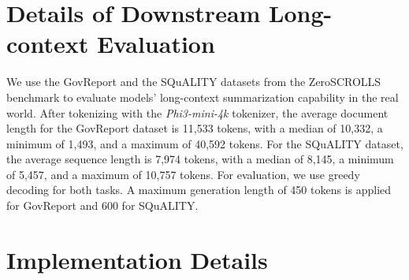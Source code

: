 \documentclass{article}
\begin{document}
\section{Details of Downstream Long-context Evaluation} \label{add_data}

We use the GovReport \citep{govreport2023} and the SQuALITY \citep{squality} datasets from the ZeroSCROLLS \citep{shaham2023zeroscrolls} benchmark to evaluate models' long-context summarization capability in the real world. After tokenizing with the \emph{Phi3-mini-4k} tokenizer, the average document length for the GovReport dataset is 11,533 tokens, with a median of 10,332, a minimum of 1,493, and a maximum of 40,592 tokens. For the SQuALITY dataset, the average sequence length is 7,974 tokens, with a median of 8,145, a minimum of 5,457, and a maximum of 10,757 tokens. For evaluation, we use greedy decoding for both tasks. A maximum generation length of 450 tokens is applied for GovReport and 600 for SQuALITY.

\section{Implementation Details} \label{impl}
\end{document}
